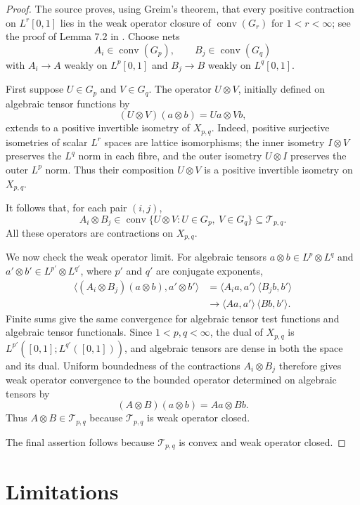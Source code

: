\documentclass[11pt]{amsart}
\theoremstyle{remark}
\newcommand{\calT}{\mathcal T}
\newcommand{\conv}{\operatorname{conv}}
\begin{document}
\begin{proof}
The source proves, using Greim's theorem, that every positive contraction on
$L^r[0,1]$ lies in the weak operator closure of $\conv(G_r)$ for
$1<r<\infty$; see the proof of Lemma 7.2 in \cite{FacklerGlueck2017}.  Choose
nets
\[
        A_i\in\conv(G_p), \qquad B_j\in\conv(G_q)
\]
with $A_i\to A$ weakly on $L^p[0,1]$ and $B_j\to B$ weakly on $L^q[0,1]$.

First suppose $U\in G_p$ and $V\in G_q$.  The operator $U\otimes V$, initially
defined on algebraic tensor functions by
\[
        (U\otimes V)(a\otimes b)=Ua\otimes Vb,
\]
extends to a positive invertible isometry of $X_{p,q}$.  Indeed, positive
surjective isometries of scalar $L^r$ spaces are lattice isomorphisms; the
inner isometry $I\otimes V$ preserves the $L^q$ norm in each fibre, and the
outer isometry $U\otimes I$ preserves the outer $L^p$ norm.  Thus their
composition $U\otimes V$ is a positive invertible isometry on $X_{p,q}$.

It follows that, for each pair $(i,j)$,
\[
        A_i\otimes B_j \in \conv\{U\otimes V: U\in G_p,\ V\in G_q\}
        \subseteq \calT_{p,q}.
\]
All these operators are contractions on $X_{p,q}$.

We now check the weak operator limit.  For algebraic tensors
$a\otimes b\in L^p\otimes L^q$ and
$a'\otimes b'\in L^{p'}\otimes L^{q'}$, where $p'$ and $q'$ are conjugate
exponents,
\[
\begin{aligned}
 \langle (A_i\otimes B_j)(a\otimes b), a'\otimes b'\rangle
 &= \langle A_i a,a'\rangle\, \langle B_j b,b'\rangle \\
 &\longrightarrow
    \langle A a,a'\rangle\, \langle B b,b'\rangle .
\end{aligned}
\]
Finite sums give the same convergence for algebraic tensor test functions and
algebraic tensor functionals.  Since $1<p,q<\infty$, the dual of
$X_{p,q}$ is $L^{p'}([0,1];L^{q'}([0,1]))$, and algebraic tensors are dense in
both the space and its dual.  Uniform boundedness of the contractions
$A_i\otimes B_j$ therefore gives weak operator convergence to the bounded
operator determined on algebraic tensors by
\[
        (A\otimes B)(a\otimes b)=Aa\otimes Bb.
\]
Thus $A\otimes B\in\calT_{p,q}$ because $\calT_{p,q}$ is weak operator closed.

The final assertion follows because $\calT_{p,q}$ is convex and weak operator
closed.
\end{proof}

\section*{Limitations}
\end{document}
